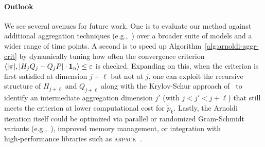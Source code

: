 \documentclass[runningheads]{llncs}
\newcommand*{\abbrev}[1]{\textsc{#1}}
\DeclarePairedDelimiter{\abs}{\lvert}{\rvert}
\DeclarePairedDelimiter{\inp}{\langle}{\rangle}
\begin{document}
\paragraph{Outlook}
We see several avenues for future work.
One is to evaluate our method against additional aggregation techniques (e.g.,~\cite{abate2021aggregation,bittracher2021aggregation,bucholz2014aggregation,michel2025formalbounds}) over a broader suite of models and a wider range of time points.
A second is to speed up Algorithm~\ref{alg:arnoldi-aggr-crit} by dynamically tuning how often the convergence criterion
$\inp*{\abs*{\pi}, \abs*{H_j Q_j - Q_j P} \cdot \mathbf{1}_n} \leq \varepsilon$
is checked.
Expanding on this, when the criterion is first satisfied at dimension $j+\ell$ but not at $j$, one can exploit the recursive structure of $H_{j+\ell}$ and $Q_{j+\ell}$ along with the Krylov-Schur approach of~\cite{stewart2002krylovschur} to identify an intermediate aggregation dimension $j'$ (with $j < j' < j+\ell$) that still meets the criterion at lower computational cost for $\tilde{p}_k$.
Lastly, the Arnoldi iteration itself could be optimized via parallel or randomized Gram-Schmidt variants (e.g.,~\cite{balabanov2022rgs,lingen2000parallelgs}), improved memory management, or integration with high‑performance libraries such as \abbrev{arpack}~\cite{lehoucq1998arpack}.

    
    
\end{document}
